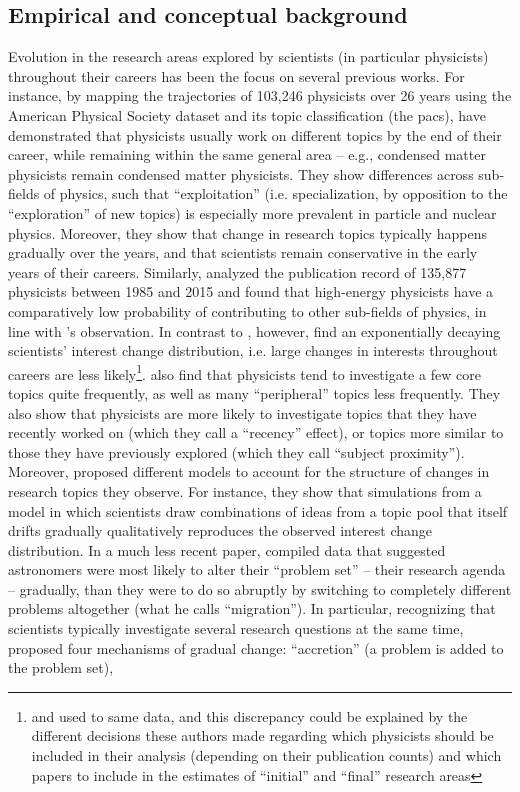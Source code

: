 \documentclass{article}
\begin{document}
\subsection{\label{sec:conceptual}Empirical and conceptual background}

Evolution in the research areas explored by scientists (in particular physicists) throughout their careers has been the focus on several previous works. For instance, by mapping the trajectories of 103,246 physicists over 26 years using the American Physical Society dataset and its topic classification (the \gls{pacs}), \citet{Aleta2019} have demonstrated that physicists usually work on different topics by the end of their career, while remaining within the same general area -- e.g., condensed matter physicists remain condensed matter physicists. They show differences across sub-fields of physics, such that ``exploitation'' (i.e. specialization, by opposition to the ``exploration'' of new topics) is especially more prevalent in particle and nuclear physics. Moreover, they show that change in research topics typically happens gradually over the years, and that scientists remain conservative in the early years of their careers. Similarly, \citet{Battiston2019} analyzed the publication record of 135,877 physicists between 1985 and 2015 and found that high-energy physicists have a comparatively low probability of contributing to other sub-fields of physics, in line with \citet{Aleta2019}'s observation. In contrast to \citet{Aleta2019}, however, \citet{Jia2017} find an exponentially decaying scientists' interest change distribution, i.e. large changes in interests throughout careers are less likely\footnote{\citet{Aleta2019} and \citet{Jia2017} used to same data, and this discrepancy could be explained by the different decisions these authors made regarding which physicists should be included in their analysis (depending on their publication counts) and which papers to include in the estimates of ``initial'' and ``final'' research areas}. \citet{Jia2017} also find that physicists tend to investigate a few core topics quite frequently, as well as many ``peripheral'' topics less frequently. They also show that physicists are more likely to investigate topics that they have recently worked on (which they call a ``recency'' effect), or topics more similar to those they have previously explored (which they call ``subject proximity''). Moreover, \citet{Jia2017} proposed different models to account for the structure of changes in research topics they observe. For instance, they show that simulations from a model in which scientists draw combinations of ideas from a topic pool that itself drifts gradually qualitatively reproduces the observed interest change distribution. In a much less recent paper, \citet{Gieryn1978} compiled data that suggested astronomers were most likely to alter their ``problem set'' -- their research agenda -- gradually, than they were to do so abruptly by switching to completely different problems altogether (what he calls ``migration''). In particular, recognizing that scientists typically investigate several research questions at the same time, \citeauthor{Gieryn1978} proposed four mechanisms of gradual change: ``accretion'' (a problem is added to the problem set),  
\end{document}
